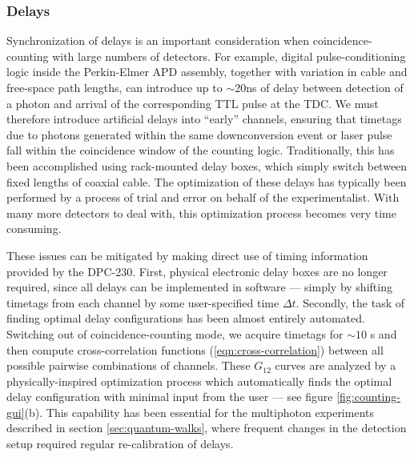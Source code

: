 \subsubsection{Delays}
Synchronization of delays is an important consideration when coincidence-counting with large numbers of detectors. For example, digital pulse-conditioning logic inside the Perkin-Elmer APD assembly, together with variation in cable and free-space path lengths, can introduce up to $\sim$20ns of delay between detection of a photon and arrival of the corresponding TTL pulse at the TDC.  We must therefore introduce artificial delays into ``early'' channels, ensuring that timetags due to photons generated within the same downconversion event or laser pulse fall within the coincidence window of the counting logic. Traditionally, this has been accomplished using rack-mounted delay boxes, which simply switch between fixed lengths of coaxial cable.  The optimization of these delays has typically been performed by a process of trial and error on behalf of the experimentalist.  With many more detectors to deal with, this optimization process becomes very time consuming.

These issues can be mitigated by making direct use of timing information provided by the DPC-230. First, physical electronic delay boxes are no longer required, since all delays can be implemented in software --- simply by shifting timetags from each channel by some user-specified time $\Delta t$. Secondly, the task of finding optimal delay configurations has been almost entirely automated. Switching out of coincidence-counting mode, we acquire timetags for $\sim 10$ s  and then compute cross-correlation functions (\ref{eqn:cross-correlation}) between all possible pairwise combinations of channels. These $G_{12}$ curves are analyzed by a physically-inspired optimization process which automatically finds the optimal delay configuration with minimal input from the user --- see figure \ref{fig:counting-gui}(b). This capability has been essential for the multiphoton experiments described in section \ref{sec:quantum-walks}, where frequent changes in the detection setup required regular re-calibration of delays.



